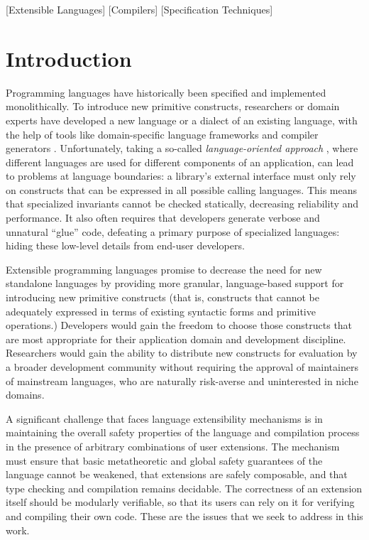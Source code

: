\documentclass[10pt]{sigplanconf}
\begin{document}
[Extensible Languages]
[Compilers]
[Specification Techniques]


\section{Introduction}
Programming languages have historically been specified and implemented monolithically. To introduce new primitive constructs, researchers or domain experts have developed a new language or a dialect of an existing language, with the help of tools like domain-specific language frameworks and compiler generators \cite{fowler2010domain}. 
Unfortunately, taking a so-called {\it language-oriented approach} \cite{journals/stp/Ward94}, where different languages are used for different components of an application, can lead to problems at language boundaries: a library's external interface must only rely on  constructs that can be expressed in all possible calling languages. This means that specialized invariants cannot be checked statically, decreasing reliability and performance. It also often requires that developers generate verbose and unnatural ``glue'' code, defeating a primary purpose of specialized languages: hiding these low-level details from end-user developers.

Extensible programming languages promise to decrease the need for new standalone languages by providing more granular, language-based support for introducing new primitive constructs (that is, constructs that cannot be adequately expressed in terms of existing syntactic forms and primitive operations.) Developers would gain the freedom to choose those constructs that are most appropriate for their application domain and development discipline. Researchers would gain the ability to distribute new constructs for evaluation by a broader development community without requiring the approval of maintainers of mainstream languages, who are naturally risk-averse and uninterested in niche domains.

A significant challenge that faces language extensibility mechanisms is in maintaining the overall safety properties of the language and compilation process in the presence of arbitrary combinations of user extensions. The mechanism must ensure that basic metatheoretic and global safety guarantees of the language cannot be weakened, that extensions are safely composable, and that type checking and compilation remains decidable. The correctness of an extension itself should be modularly verifiable, so that its users can rely on it for verifying and compiling their own code. These are the issues that we seek to address in this work.
\end{document}
